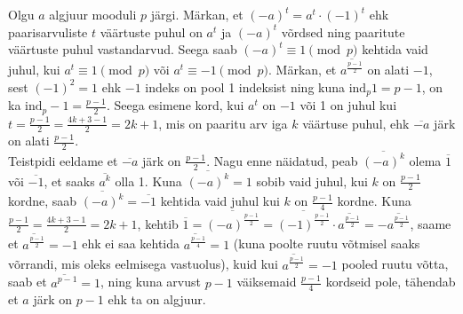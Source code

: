 \documentclass[a4paper, 10pt]{article}
\newcommand{\w}{\overline}
\begin{document}
\bigskip
Olgu $a$ algjuur mooduli $p$ järgi. Märkan, et $(-a)^t=a^t\cdot(-1)^t$ ehk paarisarvuliste $t$ väärtuste puhul on $a^t$ ja $ (-a)^t$ võrdsed ning paaritute väärtuste puhul vastandarvud. Seega saab $(-a)^t\equiv1\pmod p$ kehtida vaid juhul, kui $a^t\equiv1\pmod p$ või $a^t\equiv-1\pmod p$. Märkan, et $\w{a^{\frac{p-1}{2}}}$ on alati $-1$, sest $(-1)^2=1$ ehk $-1$ indeks on pool 1 indeksist ning kuna $\text{ind}_p1=p-1$, on ka $\text{ind}_p-1=\frac{p-1}{2}$. Seega esimene kord, kui $a^t$ on $-1$ või 1 on juhul kui $t=\frac{p-1}2=\frac{4k+3-1}{2}=2k+1$, mis on paaritu arv iga $k$ väärtuse puhul, ehk $\w{-a}$ järk on alati $\frac{p-1}2$.\\
\indent Teistpidi eeldame et $\w{-a}$ järk on $\frac{p-1}2$. Nagu enne näidatud, peab $\w{(-a)^k}$ olema $\w1$ või $\w{-1}$, et saaks $\w{a^k}$ olla 1. Kuna $\w{(-a)^k}=1$ sobib vaid juhul, kui $k$ on $\frac{p-1}2$ kordne, saab $\w{(-a)^k}=\w{-1}$ kehtida vaid juhul kui $k$ on $\frac{p-1}4$ kordne. Kuna $\frac {p-1}2=\frac{4k+3-1}{2}=2k+1$, kehtib $\w1=\w{(-a)^\frac{p-1}{2}}=\w{(-1)^\frac{p-1}{2}}\cdot\w{a^\frac{p-1}{2}}=-\w{a^\frac{p-1}{2}}$, saame et $\w{a^\frac{p-1}{2}}=-1$ ehk ei saa kehtida $\w{a^\frac{p-1}{4}}=1$ (kuna poolte ruutu võtmisel saaks võrrandi, mis oleks eelmisega vastuolus), kuid kui $\w{a^\frac{p-1}{2}}=-1$ pooled ruutu võtta, saab et $\w{a^{p-1}}=1$, ning kuna arvust $p-1$ väiksemaid $\frac{p-1}4$ kordseid pole, tähendab et $a$ järk on $p-1$ ehk ta on algjuur.
\bigskip
\end{document}
